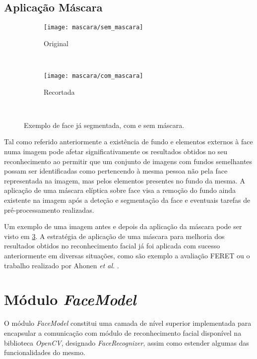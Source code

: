 \subsection{Aplicação Máscara} \label{sec:mascara}

\begin{figure}[t]
        \centering
        \begin{subfigure}[b]{0.2\textwidth}
                \centering
                \texttt{[image: mascara/sem\_mascara]}
                \caption{Original}
                \label{fig:sem-mascara}
        \end{subfigure}%
        ~ ~ ~
        \begin{subfigure}[b]{0.2\textwidth}
                \centering
                \texttt{[image: mascara/com\_mascara]}
                \caption{Recortada}
                \label{fig:com-mascara}
        \end{subfigure}
        ~ 
        \caption{Exemplo de face já segmentada, com e sem máscara.}\label{fig:mascara}
\end{figure}

Tal como referido anteriormente a existência de fundo e elementos externos à face numa imagem pode afetar significativamente os resultados obtidos no seu reconhecimento ao permitir que um conjunto de imagens com fundos semelhantes possam ser identificadas como pertencendo à mesma pessoa não pela face representada na imagem, mas pelos elementos presentes no fundo da mesma. A aplicação de uma máscara elíptica sobre face visa a remoção do fundo ainda existente na imagem após a deteção e segmentação da face e eventuais tarefas de pré-processamento realizadas.

Um exemplo de uma imagem antes e depois da aplicação da máscara pode ser visto em \ref{fig:mascara}. A estratégia de aplicação de uma máscara para melhoria dos resultados obtidos no reconhecimento facial já foi aplicada com sucesso anteriormente em diversas situações, como são exemplo a avaliação FERET \cite{Phillips2000} ou o trabalho realizado por Ahonen \textit{et al.} \cite{ahonen2004face}.

\section{Módulo \textit{FaceModel}} \label{sec:facemodel}
O módulo \textit{FaceModel} constitui uma camada de nível superior implementada para encapsular a comunicação com módulo de reconhecimento facial disponível na biblioteca \textit{OpenCV}, designado \textit{FaceRecognizer}, assim como estender algumas das funcionalidades do mesmo. 

